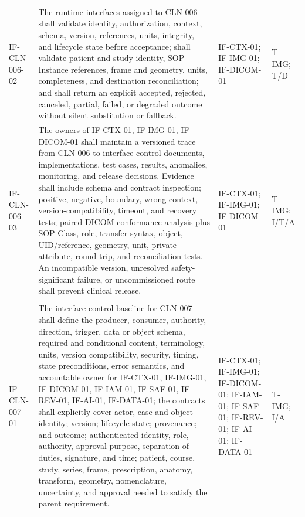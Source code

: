 \documentclass[11pt,letterpaper]{article}
\begin{document}
\begin{scriptsize}
\begin{longtable}{@{}L{0.14\textwidth}L{0.49\textwidth}L{0.19\textwidth}L{0.10\textwidth}@{}}
\addlinespace[2pt]
\mbox{IF-CLN-006-02} & The runtime interfaces assigned to CLN-006 shall validate identity, authorization, context, schema, version, references, units, integrity, and lifecycle state before acceptance; shall validate patient and study identity, SOP Instance references, frame and geometry, units, completeness, and destination reconciliation; and shall return an explicit accepted, rejected, canceled, partial, failed, or degraded outcome without silent substitution or fallback. & IF-CTX-01; IF-IMG-01; IF-DICOM-01 & T-IMG; T\slash\allowbreak{}D \\
\addlinespace[2pt]
\mbox{IF-CLN-006-03} & The owners of IF-CTX-01, IF-IMG-01, IF-DICOM-01 shall maintain a versioned trace from CLN-006 to interface-control documents, implementations, test cases, results, anomalies, monitoring, and release decisions. Evidence shall include schema and contract inspection; positive, negative, boundary, wrong-context, version-compatibility, timeout, and recovery tests; paired DICOM conformance analysis plus SOP Class, role, transfer syntax, object, UID\slash\allowbreak{}reference, geometry, unit, private-attribute, round-trip, and reconciliation tests. An incompatible version, unresolved safety-significant failure, or uncommissioned route shall prevent clinical release. & IF-CTX-01; IF-IMG-01; IF-DICOM-01 & T-IMG; I\slash\allowbreak{}T\slash\allowbreak{}A \\
\addlinespace[2pt]
 \\
\addlinespace[2pt]
\mbox{IF-CLN-007-01} & The interface-control baseline for CLN-007 shall define the producer, consumer, authority, direction, trigger, data or object schema, required and conditional content, terminology, units, version compatibility, security, timing, state preconditions, error semantics, and accountable owner for IF-CTX-01, IF-IMG-01, IF-DICOM-01, IF-IAM-01, IF-SAF-01, IF-REV-01, IF-AI-01, IF-DATA-01; the contracts shall explicitly cover actor, case and object identity; version; lifecycle state; provenance; and outcome; authenticated identity, role, authority, approval purpose, separation of duties, signature, and time; patient, course, study, series, frame, prescription, anatomy, transform, geometry, nomenclature, uncertainty, and approval needed to satisfy the parent requirement. & IF-CTX-01; IF-IMG-01; IF-DICOM-01; IF-IAM-01; IF-SAF-01; IF-REV-01; IF-AI-01; IF-DATA-01 & T-IMG; I\slash\allowbreak{}A \\

\end{longtable}
\end{scriptsize}
\end{document}
